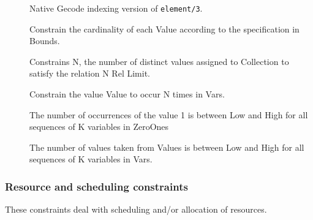 \begin{description}
\item[]
Native Gecode indexing version of {\tt element/3}.
 
\item[]
Constrain the cardinality of each Value according to the specification
in Bounds.

\item[]
Constrains N, the number of distinct values assigned to 
Collection to satisfy the relation N Rel Limit.

\item[]
Constrain the value Value to occur N times in Vars.

\item[]
The number of occurrences of the value 1 is between Low and
High for all sequences of K variables in ZeroOnes

\item[]
The number of values taken from Values is between Low and
High for all sequences of K variables in Vars.

\end{description}

\subsubsection{Resource and scheduling constraints}
These constraints deal with scheduling and/or allocation of resources.


